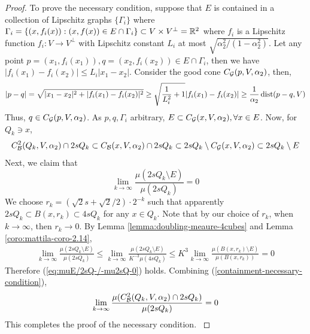 \begin{proof}
    {\color{red}
    To prove the necessary condition, suppose that $E$ is contained in a collection of Lipschitz graphs $\{\Gamma_i\}$ where $\Gamma_i = \{(x, f_i(x)) : (x, f(x))\in E\cap \Gamma_i\}\subset V\times V^\perp = \mathbb{R}^2$ where $f_i$ is a Lipschitz function $f_i: V\rightarrow V^\perp$ with Lipschitz constant $L_i$ at most $\sqrt{\alpha_2^2/(1-\alpha_2^2)}$. Let any point $p = (x_1, f_i(x_1)), q = (x_2, f_i(x_2))\in E\cap \Gamma_i$, then we have $|f_i(x_1)-f_i(x_2)| \leq L_i |x_1- x_2|$. Consider the good cone $C_\mathcal G(p, V, \alpha_2)$, then, 
    \begin{align*}
        |p-q| = \sqrt{|x_1-x_2|^2 + |f_i(x_1) - f_i(x_2)|^2} 
        \geq \sqrt{\frac{1}{L_i^2} + 1} |f_i(x_1) - f_i(x_2)|  
        \geq \frac{1}{\alpha_2} \operatorname{dist}(p-q, V)
    \end{align*}
    Thus, $q\in C_\mathcal G(p, V, \alpha_2)$. As $p,q, \Gamma_i$ arbitrary, $E\subset C_\mathcal G(x, V, \alpha_2), \forall x\in E$. Now, for $Q_k\ni x$,
    \begin{equation}\label{containment-necessary-condition}
        C_\mathcal B^{2}(Q_k, V, \alpha_2)\cap 2sQ_k \subset C_\mathcal B(x,V, \alpha_2) \cap 2sQ_k \subset 2sQ_k \setminus C_\mathcal G(x, V, \alpha_2) \subset 2sQ_k \setminus E   
    \end{equation}
    Next, we claim that
    \begin{equation}\label{eq:muE/2sQ-/-mu2sQ-0}
        \lim_{k\rightarrow \infty}\frac{\mu(2sQ_k \setminus E)}{\mu(2sQ_k)} =0
    \end{equation}
    We choose $r_k = (\sqrt{2}s + \sqrt{2}/2) \cdot 2^{-k}$ such that apparently $2sQ_k\subset B(x,r_k)\subset 4sQ_k$ for any $x\in Q_k$. Note that by our choice of $r_k$, when $k\rightarrow\infty$, then $r_k\rightarrow 0$. By Lemma \ref{lemma:doubling-meaure-4cubes} and Lemma \ref{coro:mattila-coro-2.14},
    \begin{equation*}
        \begin{split}
            \lim_{k\rightarrow \infty} \frac{\mu(2sQ_k \setminus E)}{\mu(2sQ_k)} 
            \leq \lim_{k\rightarrow \infty} \frac{\mu(2sQ_k \setminus E)}{K^{-3}\mu(4sQ_k)} 
            \leq K^3 \lim_{k\rightarrow \infty} \frac{\mu(B(x, r_k) \setminus E)}{\mu(B(x, r_k))} = 
            0
        \end{split}
    \end{equation*}
    Therefore (\ref{eq:muE/2sQ-/-mu2sQ-0}) holds. Combining (\ref{containment-necessary-condition}),
    \begin{equation*}
        \lim_{k\rightarrow \infty}\frac{\mu(C_\mathcal B^{2}(Q_k, V, \alpha_2)\cap 2sQ_k)}{\mu(2sQ_k)} =0
    \end{equation*}
    This completes the proof of the necessary condition. 
    }
\end{proof}




